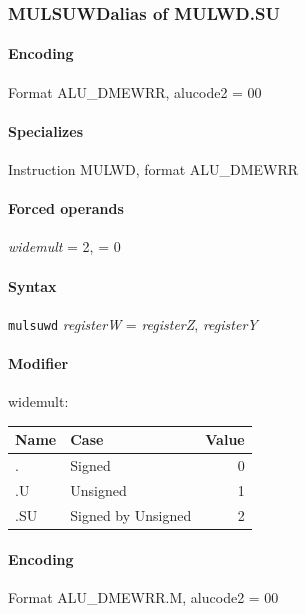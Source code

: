 {\subsubsection[{\small MULSUWD: alias of MULWD.SU}]{MULSUWD\hfill alias of MULWD.SU}
\label{instr:MULSUWD}

\paragraph{Encoding} Format \textsf{ALU\_DMEWRR, alucode2 = 00}\\



\paragraph{Specializes} Instruction MULWD, format ALU\_DMEWRR

\paragraph{Forced operands} \emph{widemult} = 2, \emph{} = 0

\paragraph{Syntax} \texttt{mulsuwd} \emph{registerW} = \emph{registerZ}, \emph{registerY}

\paragraph{Modifier} \textsf{widemult}:\\

\noindent \begin{tabular}{|l|l|r|} \hline
\bf{Name} & \bf{Case} & \bf{Value} \\ \hline
. & Signed & 0 \\
.U & Unsigned & 1 \\
.SU & Signed by Unsigned & 2 \\
\hline \end{tabular}

\paragraph{Encoding} Format \textsf{ALU\_DMEWRR.M, alucode2 = 00}\\

}
